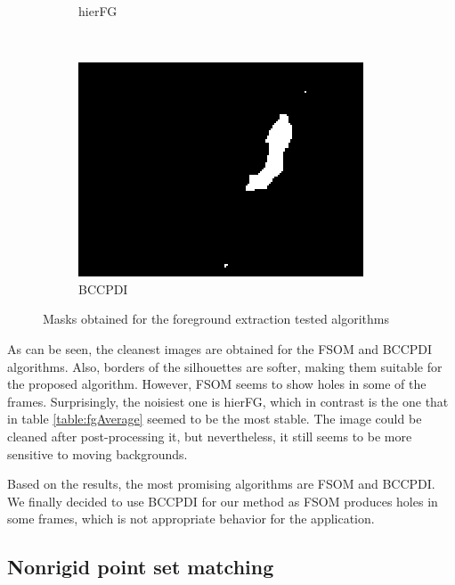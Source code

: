 \begin{figure}[t]
\begin{subfigure}[b]{0.19\textwidth}
                \caption{hierFG}
                \label{fig:cp02_hierFGmask}
        \end{subfigure}%
	~ %
	\begin{subfigure}[b]{0.19\textwidth}
                \centering
                \includegraphics[width=\textwidth]{fig17.jpg}
                \caption{BCCPDI}
                \label{fig:cp02_bccpdiMask}
        \end{subfigure}%

        \caption{Masks obtained for the foreground extraction tested algorithms}\label{fig:cp02_fgMasks}
\end{figure}

As can be seen, the cleanest images are obtained for the FSOM and BCCPDI algorithms. Also, borders of the silhouettes 
are softer, making them suitable for the proposed algorithm. However, FSOM seems to show holes in some of the frames. 
Surprisingly, the noisiest one is hierFG, which in contrast is the one that in table \ref{table:fgAverage} seemed to be 
the most stable. The image could be cleaned after post-processing it, but nevertheless, it still seems to be more 
sensitive to moving backgrounds.

Based on the results, the most promising algorithms are FSOM and BCCPDI. We finally decided to use BCCPDI for our method 
as FSOM produces holes in some frames, which is not appropriate behavior for the application.

\subsection{Nonrigid point set matching}\label{ch:chapter02_02_02}

